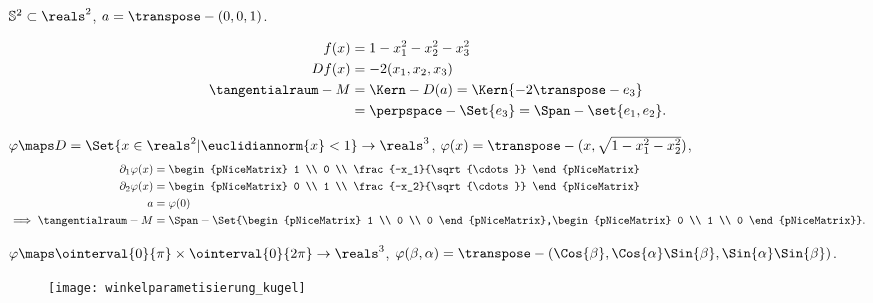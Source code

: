 \begin{beispiel*}
  \( \mathbb{S}^2\subset \reals^2 \), \( a=\transpose-{(0,0,1)} \).
  \begin{eigenschaftenenumerate}
    \item
    \begin{align*}
      f(x)&=1-x_1^2-x_2^2-x_3^2\\
      Df(x)&=-2(x_1,x_2,x_3)\\
      \tangentialraum-{M}&=\Kern-{D(a)}=\Kern{-2\transpose-{e_3}}\\
      &=\perpspace-{\Set{e_3}}=\Span-{\set{e_1,e_2}}.
    \end{align*}
    \item \( \varphi\maps D=\Set{x\in \reals^2|\euclidiannorm{x}<1} \to \reals^3\), \( \varphi(x)=\transpose-{(x,\sqrt{1-x_1^2-x_2^2})} \),
    \begin{align*}
      \partial_1 \varphi(x)&=\begin{pNiceMatrix} 1 \\ 0 \\ \frac{-x_1}{\sqrt{\cdots}} \end{pNiceMatrix}\\
      \partial_2 \varphi(x)&=\begin{pNiceMatrix} 0 \\ 1 \\ \frac{-x_2}{\sqrt{\cdots}} \end{pNiceMatrix}\\
      a&= \varphi(0)\\
      \implies \tangentialraum-{M}&=\Span-{\Set{\begin{pNiceMatrix} 1 \\ 0 \\ 0 \end{pNiceMatrix},\begin{pNiceMatrix} 0 \\ 1 \\ 0 \end{pNiceMatrix}}}.
    \end{align*}
    \item \( \varphi\maps \ointerval{0}{\pi}\times\ointerval{0}{2\pi} \to \reals^3\), \( \varphi(\beta,\alpha)=\transpose-{(\Cos{\beta},\Cos{\alpha}\Sin{\beta},\Sin{\alpha}\Sin{\beta})} \). 
    \begin{figure}[H]
      \centering
      \texttt{[image: winkelparametisierung\_kugel]}
      \label{fig:winkelparametisierung_kugel}
    \end{figure}

\end{eigenschaftenenumerate}
\end{beispiel*}
